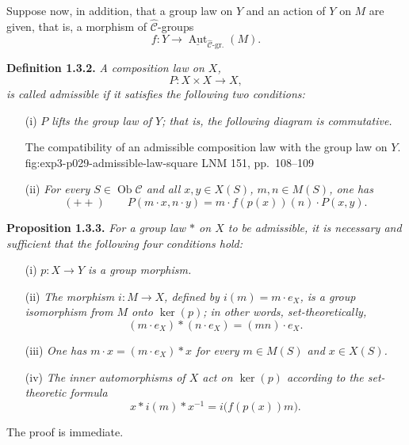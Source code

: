 Suppose now, in addition, that a group law on \(Y\) and an action of
\(Y\) on \(M\) are given, that is, a morphism of
\(\widehat{\mathscr C}\)-groups
\[
 f:Y\longrightarrow
 \underline{\operatorname{Aut}}_{\widehat{\mathscr C}\text{-gr.}}(M).
\]

\medskip
\noindent{}\textbf{Definition 1.3.2.}
\textit{A composition law on \(X\),}
\[
 P:X\times X\longrightarrow X,
\]
\textit{is called \emph{admissible} if it satisfies the following two
conditions:}

\begin{enumerate}
 \item[\SGAInlineRefTarget{sga3:iii:definition:1-3-2:item:i}(i)] \textit{\(P\) lifts the group law of \(Y\); that is, the
 following diagram is commutative.}

  {The compatibility of an admissible composition law with the group
   law on \(Y\).}
  {fig:exp3-p029-admissible-law-square}
  {LNM 151, pp.~108--109}

 \item[\SGAInlineRefTarget{sga3:iii:definition:1-3-2:item:ii}(ii)] \textit{For every \(S\in\operatorname{Ob}\mathscr C\)
 and all \(x,y\in X(S)\), \(m,n\in M(S)\), one has}
 \[
  (++)\qquad
  P(m\cdot x,n\cdot y)
   =m\cdot f(p(x))(n)\cdot P(x,y).
 \]
\end{enumerate}

\medskip
\noindent{}\textbf{Proposition 1.3.3.}
\textit{For a group law \(\ast\) on \(X\) to be admissible, it is
necessary and sufficient that the following four conditions hold:}
\begin{enumerate}
 \item[(i)] \textit{\(p:X\to Y\) is a group morphism.}

 \item[(ii)] \textit{The morphism \(i:M\to X\), defined by
 \(i(m)=m\cdot e_X\), is a group isomorphism from \(M\) onto
 \(\ker(p)\); in other words, set-theoretically,}
 \[
  (m\cdot e_X)\ast(n\cdot e_X)=(mn)\cdot e_X.
 \]

 \item[(iii)] \textit{One has
 \(m\cdot x=(m\cdot e_X)\ast x\) for every
 \(m\in M(S)\) and \(x\in X(S)\).}

 \item[(iv)] \textit{The inner automorphisms of \(X\) act on
 \(\ker(p)\) according to the set-theoretic formula}
 \[
  x\ast i(m)\ast x^{-1}=i\bigl(f(p(x))m\bigr).
 \]
\end{enumerate}
The proof is immediate.


